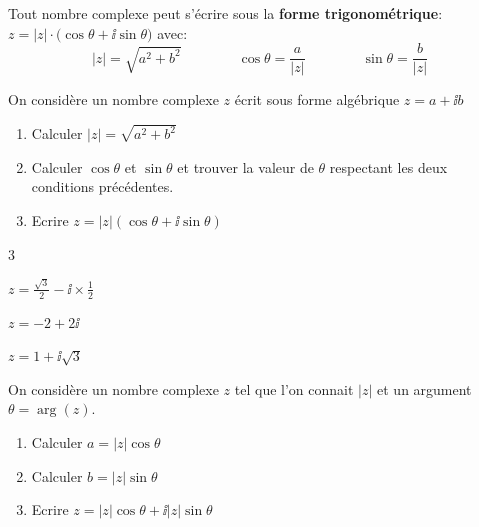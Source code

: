 \begin{definition}
		Tout nombre complexe peut s'écrire sous la \textbf{forme trigonométrique}: $\boxed{z=|z|\cdot \Biggl(\cos \theta + \ii \sin \theta \Biggr)}$ avec:
\smallskip
		\[\boxed{|z|=\sqrt{a^2+b^2} \qquad \qquad \cos \theta = \dfrac{a}{|z|} \qquad \qquad \sin \theta = \dfrac{b}{|z|}}\]

	\end{definition}

\begin{methode}

	On considère un nombre complexe $z$ écrit sous forme algébrique $z=a+\ii b$ 

	\begin{enumerate}
		\item Calculer $|z|=\sqrt{a^2+b^2}$
		\item Calculer $\cos \theta$ et $\sin \theta$ et trouver la valeur de $\theta$ respectant les deux conditions précédentes.
		\item Ecrire $z=|z|\left(\cos \theta + \ii \sin \theta \right)$
	\end{enumerate}

\end{methode}

\begin{exercice_cours}

	\begin{enumerate}

	\end{enumerate}

\end{exercice_cours}


\begin{methode}

	On considère un nombre complexe $z$ tel que l'on connait $|z|$ et un argument $\theta=\arg(z)$. 

	\begin{enumerate}
		\item Calculer $a=|z|\cos\theta$
		\item Calculer $b=|z|\sin\theta$
		\item Ecrire $z=|z|\cos\theta + \ii |z|\sin\theta$
	\end{enumerate}

\end{methode}


